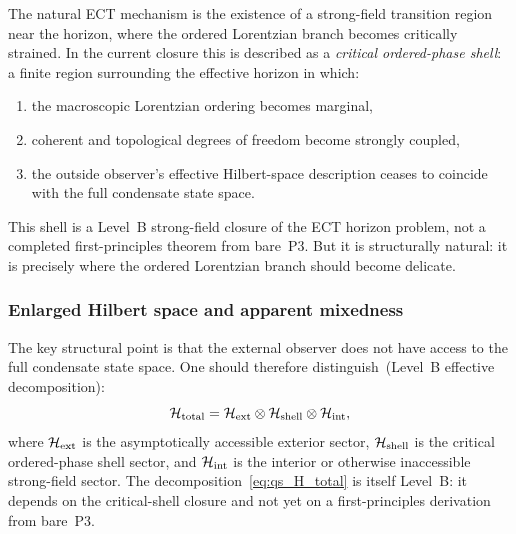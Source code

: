\documentclass[11pt,a4paper]{article}
\numberwithin{equation}{section}
\begin{document}
The natural ECT mechanism is the existence of a strong-field transition
region near the horizon, where the ordered Lorentzian branch becomes
critically strained.
In the current closure this is described as a
\emph{critical ordered-phase shell}: a finite region surrounding the
effective horizon in which:
\begin{enumerate}[label=(\roman*)]
  \item the macroscopic Lorentzian ordering becomes marginal,
  \item coherent and topological degrees of freedom become strongly
    coupled,
  \item the outside observer's effective Hilbert-space description
    ceases to coincide with the full condensate state space.
\end{enumerate}
This shell is a Level~B strong-field closure of the ECT horizon problem,
not a completed first-principles theorem from bare~P3.
But it is structurally natural: it is precisely where the ordered
Lorentzian branch should become delicate.

\subsubsection*{Enlarged Hilbert space and apparent mixedness}

The key structural point is that the external observer does not have
access to the full condensate state space.
One should therefore distinguish~(Level~B effective decomposition):
\begin{equation}
  \label{eq:qs_H_total}
  \mathcal{H}_{\rm total}
  =
  \mathcal{H}_{\rm ext}
  \otimes
  \mathcal{H}_{\rm shell}
  \otimes
  \mathcal{H}_{\rm int},
\end{equation}
where $\mathcal{H}_{\rm ext}$ is the asymptotically accessible exterior
sector, $\mathcal{H}_{\rm shell}$ is the critical ordered-phase shell
sector, and $\mathcal{H}_{\rm int}$ is the interior or otherwise
inaccessible strong-field sector.
The decomposition~\eqref{eq:qs_H_total} is itself Level~B: it
depends on the critical-shell closure and not yet on a first-principles
derivation from bare~P3.
\end{document}
